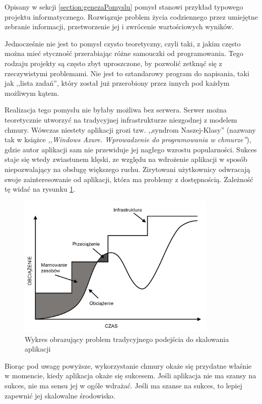 \documentclass[12pt,a4paper,twoside,titlepage,openright]{book}
\begin{document}
Opisany w sekcji \ref{section:genezaPomyslu} pomysł stanowi przykład typowego projektu informatycznego. Rozwiązuje problem życia codziennego przez umiejętne zebranie informacji, przetworzenie jej i zwrócenie wartościowych wyników. 

Jednocześnie nie jest to pomysł czysto teoretyczny, czyli taki, z jakim często można mieć styczność przerabiając różne samouczki od programowania. Tego rodzaju projekty są często zbyt uproszczone, by pozwolić zetknąć się z rzeczywistymi problemami. Nie jest to sztandarowy program do napisania, taki jak ,,lista zadań'', który został już przerobiony przez innych pod każdym możliwym kątem.

Realizacja tego pomysłu nie byłaby możliwa bez serwera. Serwer można teoretycznie utworzyć na tradycyjnej infrastrukturze niezgodnej z modelem chmury. Wówczas niestety aplikacji grozi tzw. ,,syndrom Naszej-Klasy'' (nazwany tak w książce \textit{,,Windows Azure. Wprowadzenie do programowania w chmurze''}), gdzie autor aplikacji sam nie przewiduje jej nagłego wzrostu popularności. Sukces staje się wtedy zwiastunem klęski, ze względu na wdrożenie aplikacji w sposób niepozwalający na obsługę większego ruchu. Zirytowani użytkownicy odwracają swoje zainteresowanie od aplikacji, która ma problemy z dostępnością. \cite{windowsAzureWprowadzenie} Zależność tę widać na rysunku \ref{fig:nasza-klasa}.

\begin{figure}[h]
	\centering
			\includegraphics[width=0.85\textwidth]{nasza-klasa.png}
		\caption{Wykres obrazujący problem tradycyjnego podejścia do skalowania aplikacji \cite{windowsAzureWprowadzenie}}
		\label{fig:nasza-klasa}
\end{figure}

Biorąc pod uwagę powyższe, wykorzystanie chmury okaże się przydatne właśnie w momencie, kiedy aplikacja okaże się sukcesem. Jeśli aplikacja nie ma szansy na sukces, nie ma sensu jej w ogóle  wdrażać. Jeśli ma szanse na sukces, to lepiej zapewnić jej skalowalne środowisko.
\end{document}

